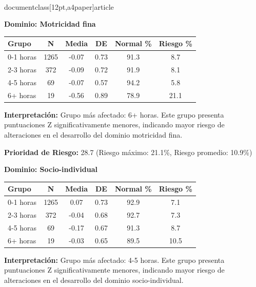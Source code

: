 \\documentclass[12pt,a4paper]{article}
\begin{document}
\vspace{0.5cm}


\textbf{Dominio: Motricidad fina}


\begin{center}
\begin{tabular}{|l|c|c|c|c|c|}
\hline
\textbf{Grupo} & \textbf{N} & \textbf{Media} & \textbf{DE} & \textbf{Normal \%} & \textbf{Riesgo \%} \\
\hline
0-1 horas & 1265 & -0.07 & 0.73 & 91.3 & 8.7 \\
2-3 horas & 372 & -0.09 & 0.72 & 91.9 & 8.1 \\
4-5 horas & 69 & -0.07 & 0.57 & 94.2 & 5.8 \\
6+ horas & 19 & -0.56 & 0.89 & 78.9 & 21.1 \\

\hline
\end{tabular}
\end{center}


\textbf{Interpretación:} Grupo más afectado: 6+ horas. Este grupo presenta puntuaciones Z significativamente menores, indicando mayor riesgo de alteraciones en el desarrollo del dominio motricidad fina.

\textbf{Prioridad de Riesgo:} 28.7 (Riesgo máximo: 21.1\%, Riesgo promedio: 10.9\%)


\vspace{0.5cm}


\textbf{Dominio: Socio-individual}


\begin{center}
\begin{tabular}{|l|c|c|c|c|c|}
\hline
\textbf{Grupo} & \textbf{N} & \textbf{Media} & \textbf{DE} & \textbf{Normal \%} & \textbf{Riesgo \%} \\
\hline
0-1 horas & 1265 & 0.07 & 0.73 & 92.9 & 7.1 \\
2-3 horas & 372 & -0.04 & 0.68 & 92.7 & 7.3 \\
4-5 horas & 69 & -0.17 & 0.67 & 91.3 & 8.7 \\
6+ horas & 19 & -0.03 & 0.65 & 89.5 & 10.5 \\

\hline
\end{tabular}
\end{center}


\textbf{Interpretación:} Grupo más afectado: 4-5 horas. Este grupo presenta puntuaciones Z significativamente menores, indicando mayor riesgo de alteraciones en el desarrollo del dominio socio-individual.
\end{document}
